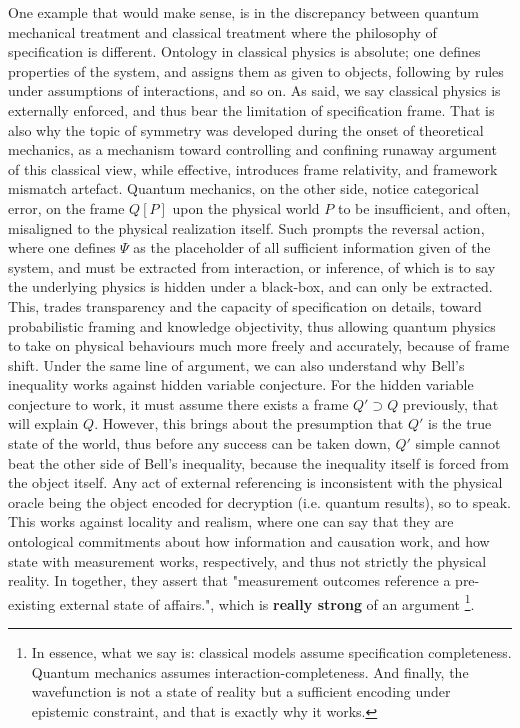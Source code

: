 \documentclass[%
 reprint,
 amsmath,amssymb,
 aps,
]{revtex4-2}
\begin{document}
One example that would make sense, is in the discrepancy between quantum mechanical treatment and classical treatment where the philosophy of specification is different. Ontology in classical physics is absolute; one defines properties of the system, and assigns them as given to objects, following by rules under assumptions of interactions, and so on. As said, we say classical physics is externally enforced, and thus bear the limitation of specification frame. That is also why the topic of symmetry was developed during the onset of theoretical mechanics, as a mechanism toward controlling and confining runaway argument of this classical view, while effective, introduces frame relativity, and framework mismatch artefact. Quantum mechanics, on the other side, notice categorical error, on the frame $Q[P]$ upon the physical world $P$ to be insufficient, and often, misaligned to the physical realization itself. Such prompts the reversal action, where one defines $\Psi$ as the placeholder of all sufficient information given of the system, and must be extracted from interaction, or inference, of which is to say the underlying physics is hidden under a black-box, and can only be extracted. This, trades transparency and the capacity of specification on details, toward probabilistic framing and knowledge objectivity, thus allowing quantum physics to take on physical behaviours much more freely and accurately, because of frame shift. Under the same line of argument, we can also understand why Bell's inequality works against hidden variable conjecture. For the hidden variable conjecture to work, it must assume there exists a frame $Q'\supset Q$ previously, that will explain $Q$. However, this brings about the presumption that $Q'$ is the true state of the world, thus before any success can be taken down, $Q'$ simple cannot beat the other side of Bell's inequality, because the inequality itself is forced from the object itself. Any act of external referencing is inconsistent with the physical oracle being the object encoded for decryption (i.e. quantum results), so to speak. This works against locality and realism, where one can say that they are ontological commitments about how information and causation work, and how state with measurement works, respectively, and thus not strictly the physical reality. In together, they assert that "measurement outcomes reference a pre-existing external state of affairs.", which is \textbf{really strong} of an argument \footnote{In essence, what we say is: classical models assume specification completeness. Quantum mechanics assumes interaction-completeness. And finally, the wavefunction is not a state of reality but a sufficient encoding under epistemic constraint, and that is exactly why it works.}. 
\end{document}
